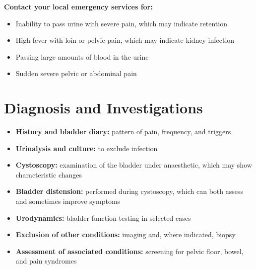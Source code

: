 \textbf{Contact your local emergency services for:}
\begin{itemize}
    \item Inability to pass urine with severe pain, which may indicate retention
    \item High fever with loin or pelvic pain, which may indicate kidney infection
    \item Passing large amounts of blood in the urine
    \item Sudden severe pelvic or abdominal pain
\end{itemize}

\section*{Diagnosis and Investigations}
\begin{itemize}
    \item \textbf{History and bladder diary:} pattern of pain, frequency, and triggers
    \item \textbf{Urinalysis and culture:} to exclude infection
    \item \textbf{Cystoscopy:} examination of the bladder under anaesthetic, which may show characteristic changes
    \item \textbf{Bladder distension:} performed during cystoscopy, which can both assess and sometimes improve symptoms
    \item \textbf{Urodynamics:} bladder function testing in selected cases
    \item \textbf{Exclusion of other conditions:} imaging and, where indicated, biopsy
    \item \textbf{Assessment of associated conditions:} screening for pelvic floor, bowel, and pain syndromes
\end{itemize}

